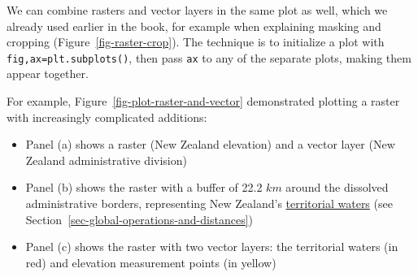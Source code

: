 \documentclass[
  letterpaper,
]{krantz}
\providecommand{\tightlist}{%
  \setlength{\itemsep}{0pt}\setlength{\parskip}{0pt}}\usepackage{longtable,booktabs,array}
\begin{document}
We can combine rasters and vector layers in the same plot as well, which
we already used earlier in the book, for example when explaining masking
and cropping (Figure~\ref{fig-raster-crop}). The technique is to
initialize a plot with \texttt{fig,ax=plt.subplots()}, then pass
\texttt{ax} to any of the separate plots, making them appear together.

For example, Figure~\ref{fig-plot-raster-and-vector} demonstrated
plotting a raster with increasingly complicated additions:

\begin{itemize}
\tightlist
\item
  Panel (a) shows a raster (New Zealand elevation) and a vector layer
  (New Zealand administrative division)
\item
  Panel (b) shows the raster with a buffer of 22.2 \(km\) around the
  dissolved administrative borders, representing New Zealand's
  \href{https://en.wikipedia.org/wiki/Territorial_waters}{territorial
  waters} (see Section~\ref{sec-global-operations-and-distances})
\item
  Panel (c) shows the raster with two vector layers: the territorial
  waters (in red) and elevation measurement points (in yellow)
\end{itemize}
\end{document}

